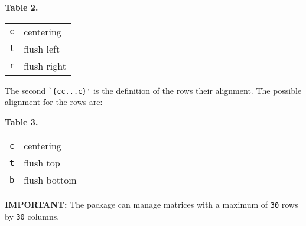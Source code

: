 \documentclass[twoside,a4paper]{article}
\begin{document}
\begin{dotlist}
\begin{center}
    \par
    \textbf{Table 2.}\nobreak\\[1em]
    \begin{tabular}{|l|l|}
      \hline
      \verb|c| & centering \\
      \verb|l| & flush left \\
      \verb|r| & flush right \\
      \hline
    \end{tabular}
    \par
  \end{center}
  \item
  The second \verb|`{cc...c}'| is the definition of the rows their
  alignment.  The possible alignment for the rows are:
  \begin{center}
    \par
    \textbf{Table 3.}\nobreak\\[1em]
    \begin{tabular}{|l|l|}
      \hline
      \verb|c| & centering \\
      \verb|t| & flush top \\
      \verb|b| & flush bottom \\
      \hline
    \end{tabular}
    \par
  \end{center}
\end{dotlist}
%
%
%
\textbf{IMPORTANT:} The package can manage matrices with a maximum of
\verb|30| rows by \verb|30| columns.
\end{document}
